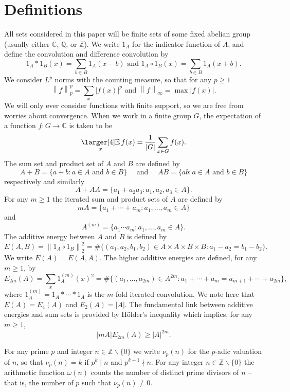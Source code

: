 \documentclass{amsart}
\renewcommand{\geq}{\geqslant}
\newcommand{\bbz}{\mathbb{Z}}
\newcommand{\bbq}{\mathbb{Q}}
\newcommand{\bbc}{\mathbb{C}}
\newcommand*{\bbe}{
  \mathop{
    \mathchoice{\vcenter{\hbox{\larger[4]$\mathbb{E}$}}}
               {\kern0pt\mathbb{E}}
               {\kern0pt\mathbb{E}}
               {\kern0pt\mathbb{E}}
  }\displaylimits
}
\newcommand{\abs}[1]{\left\lvert #1\right\rvert}
\newcommand{\Abs}[1]{\lvert #1\rvert}
\newcommand{\norm}[1]{\left\lVert #1\right\rVert}
\theoremstyle{definition}
\begin{document}
\section{Definitions}\label{sec-defs}
All sets considered in this paper will be finite sets of some fixed abelian group (usually either $\bbc$, $\bbq$, or $\bbz$). We write $1_A$ for the indicator function of $A$, and define the convolution and difference convolution by
\[1_A\ast 1_B(x)=\sum_{b\in B}1_A(x-b)\textrm{ and }1_A\circ 1_B(x)=\sum_{b\in B}1_A(x+b).\]
We consider $L^p$ norms with the counting measure, so that for any $p\geq 1$
\[\norm{f}_p^p=\sum_x \lvert f(x)\rvert^p\textrm{ and }\norm{f}_\infty=\max\lvert f(x)\rvert.\]
We will only ever consider functions with finite support, so we are free from worries about convergence. When we work in a finite group $G$, the expectation of a function $f: G \to \bbc$ is taken to be \[\bbe_x f(x) = \frac1{\abs{G}} \sum_{x \in G} f(x).\]
The sum set and product set of $A$ and $B$ are defined by
\[A+B = \{ a+b : a\in A\textrm{ and }b\in B\}\quad\textrm{ and }\quad AB = \{ ab : a\in A\textrm{ and }b\in B\}\]
respectively and similarly 
\[ A+AA = \{ a_1 + a_2a_3 : a_1, a_2, a_3 \in A\}.\]
For any $m\geq 1$ the iterated sum and product sets of $A$ are defined by
\[mA = \{a_1+\cdots+a_m : a_1,\ldots,a_m\in A\}\]
and
\[A^{(m)} = \{a_1\cdots a_m : a_1,\ldots,a_m\in A\}.\]
The additive energy between $A$ and $B$ is defined by
\[E(A,B) = \norm{1_A\circ 1_B}_2^2=\#\{ (a_1,a_2,b_1,b_2)\in A\times A\times B\times B : a_1-a_2=b_1-b_2\}.\]
We write $E(A)=E(A,A)$. The higher additive energies are defined, for any $m\geq 1$, by
\[E_{2m}(A) = \sum_{x}1_A^{(m)}(x)^2 = \#\{ (a_1,\ldots,a_{2m})\in A^{2m}: a_1+\cdots +a_m=a_{m+1}+\cdots+a_{2m}\},\]
where $1_A^{(m)}=1_A\ast \cdots \ast 1_A$ is the $m$-fold iterated convolution. We note here that $E(A)=E_4(A)$ and $E_2(A)=\abs{A}$. The fundamental link between additive energies and sum sets is provided by H\"{o}lder's inequality which implies, for any $m\geq 1$,
\begin{equation}\label{eq-holderenergy}
\Abs{mA}E_{2m}(A)\geq \abs{A}^{2m}.
\end{equation}

For any prime $p$ and integer $n\in \bbz\backslash\{0\}$ we write $\nu_p(n)$ for the $p$-adic valuation of $n$, so that $\nu_p(n)=k$ if $p^k\mid n$ and $p^{k+1}\nmid n$. For any integer $n\in \bbz\backslash\{0\}$ the arithmetic function $\omega(n)$ counts the number of distinct prime divisors of $n$ -- that is, the number of $p$ such that $\nu_p(n)\neq 0$.
\end{document}
